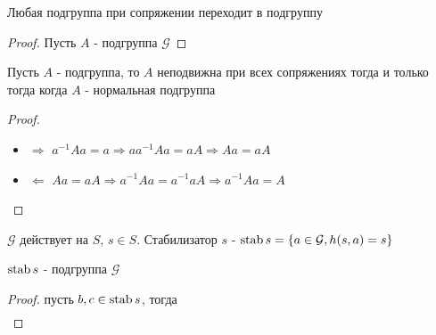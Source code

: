\documentclass[../main/document.tex]{subfiles}
\begin{document}
\begin{thm}
Любая подгруппа при сопряжении переходит в подгруппу
\begin{proof}
Пусть $A$ - подгруппа $\mathcal{G}$
\end{proof}
\end{thm}

\begin{thm}
Пусть $A$ - подгруппа, то $A$ неподвижна при всех сопряжениях тогда и только тогда когда $A$ - нормальная подгруппа
\begin{proof}
\begin{itemize}
\item $\Rightarrow$ $a^{-1}Aa=a\Rightarrow aa^{-1}Aa=aA\Rightarrow Aa=aA$
\item $\Leftarrow$ $Aa=aA\Rightarrow a^{-1}Aa=a^{-1}aA\Rightarrow a^{-1}Aa=A$
\end{itemize}
\end{proof}
\end{thm}

\begin{dfn}
$\mathcal{G}$ действует на $S$, $s\in S$. Стабилизатор $s$ - $\operatorname{stab} s=\{a\in \mathcal{G},h(s,a)=s\}$
\end{dfn}

\begin{thm}
$\operatorname{stab} s$ - подгруппа $\mathcal{G}$
\begin{proof}
пусть $b,c \in \operatorname{stab} s$, тогда
\begin{multline*}

\end{multline*}

\end{proof}
\end{thm}
\end{document}
